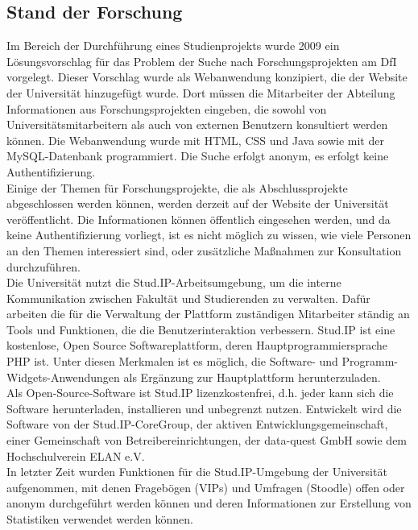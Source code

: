 \subsection{Stand der Forschung}
Im Bereich der Durchführung eines Studienprojekts wurde 2009\cite{Watat:2019} ein Lösungsvorschlag für das Problem der Suche nach Forschungsprojekten am DfI vorgelegt. Dieser Vorschlag wurde als Webanwendung konzipiert, die der Website der Universität hinzugefügt wurde. Dort müssen die Mitarbeiter der Abteilung Informationen aus Forschungsprojekten eingeben, die sowohl von Universitätsmitarbeitern als auch von externen Benutzern konsultiert werden können.
Die Webanwendung wurde mit HTML, CSS und Java sowie mit der MySQL-Datenbank programmiert. Die Suche erfolgt anonym, es erfolgt keine Authentifizierung.\\

Einige der Themen für Forschungsprojekte, die als Abschlussprojekte abgeschlossen werden können, werden derzeit auf der Website der Universität veröffentlicht. Die Informationen können öffentlich eingesehen werden, und da keine Authentifizierung vorliegt, ist es nicht möglich zu wissen, wie viele Personen an den Themen interessiert sind, oder zusätzliche Ma{\ss}nahmen zur Konsultation durchzuführen.\\

Die Universität nutzt die Stud.IP-Arbeitsumgebung, um die interne Kommunikation zwischen Fakultät und Studierenden zu verwalten. Dafür arbeiten die für die Verwaltung der Plattform zuständigen Mitarbeiter ständig an Tools und Funktionen, die die Benutzerinteraktion verbessern.
Stud.IP ist eine kostenlose, Open Source Softwareplattform, deren Hauptprogrammiersprache PHP ist\cite{SIPPHP:2020}. Unter diesen Merkmalen ist es möglich, die Software- und Programm-Widgets-Anwendungen als Ergänzung zur Hauptplattform herunterzuladen.\\
Als Open-Source-Software ist Stud.IP lizenzkostenfrei\cite{SIPOS:2020}, d.h. jeder kann sich die Software herunterladen, installieren und unbegrenzt nutzen. Entwickelt wird die Software von der Stud.IP-CoreGroup, der aktiven Entwicklungsgemeinschaft, einer Gemeinschaft von Betreibereinrichtungen, der data-quest GmbH sowie dem Hochschulverein ELAN e.V.\\

In letzter Zeit wurden Funktionen für die Stud.IP-Umgebung der Universität aufgenommen, mit denen Fragebögen (VIPs) und Umfragen (Stoodle) offen oder anonym durchgeführt werden können und deren Informationen zur Erstellung von Statistiken verwendet werden können.